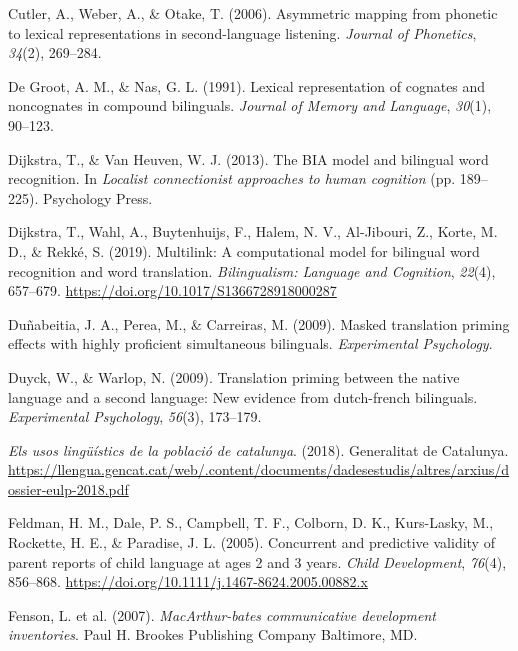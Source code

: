 \documentclass[
]{article}
\newlength{\cslhangindent}
\newlength{\cslentryspacingunit} %
\newenvironment{CSLReferences}[2] %
 {%
  \setlength{\parindent}{0pt}
  \ifodd #1
  \let\oldpar\par
  \def\par{\hangindent=\cslhangindent\oldpar}
  \fi
  \setlength{\parskip}{#2\cslentryspacingunit}
 }%
 {}
\begin{document}
\begin{CSLReferences}{1}{0}
\leavevmode{}%
Cutler, A., Weber, A., \& Otake, T. (2006). Asymmetric mapping from
phonetic to lexical representations in second-language listening.
\emph{Journal of Phonetics}, \emph{34}(2), 269--284.

\leavevmode{}%
De Groot, A. M., \& Nas, G. L. (1991). Lexical representation of
cognates and noncognates in compound bilinguals. \emph{Journal of Memory
and Language}, \emph{30}(1), 90--123.

\leavevmode{}%
Dijkstra, T., \& Van Heuven, W. J. (2013). The BIA model and bilingual
word recognition. In \emph{Localist connectionist approaches to human
cognition} (pp. 189--225). Psychology Press.

\leavevmode{}%
Dijkstra, T., Wahl, A., Buytenhuijs, F., Halem, N. V., Al-Jibouri, Z.,
Korte, M. D., \& Rekké, S. (2019). Multilink: A computational model for
bilingual word recognition and word translation. \emph{Bilingualism:
Language and Cognition}, \emph{22}(4), 657--679.
\url{https://doi.org/10.1017/S1366728918000287}

\leavevmode{}%
Duñabeitia, J. A., Perea, M., \& Carreiras, M. (2009). Masked
translation priming effects with highly proficient simultaneous
bilinguals. \emph{Experimental Psychology}.

\leavevmode{}%
Duyck, W., \& Warlop, N. (2009). Translation priming between the native
language and a second language: New evidence from dutch-french
bilinguals. \emph{Experimental Psychology}, \emph{56}(3), 173--179.

\leavevmode{}%
\emph{Els usos lingüístics de la població de catalunya}. (2018).
Generalitat de Catalunya.
\url{https://llengua.gencat.cat/web/.content/documents/dadesestudis/altres/arxius/dossier-eulp-2018.pdf}

\leavevmode{}%
Feldman, H. M., Dale, P. S., Campbell, T. F., Colborn, D. K.,
Kurs-Lasky, M., Rockette, H. E., \& Paradise, J. L. (2005). Concurrent
and predictive validity of parent reports of child language at ages 2
and 3 years. \emph{Child Development}, \emph{76}(4), 856--868.
\url{https://doi.org/10.1111/j.1467-8624.2005.00882.x}

\leavevmode{}%
Fenson, L. et al. (2007). \emph{{MacArthur}-bates communicative
development inventories}. Paul H. Brookes Publishing Company Baltimore,
{MD}.


\end{CSLReferences}
\end{document}
